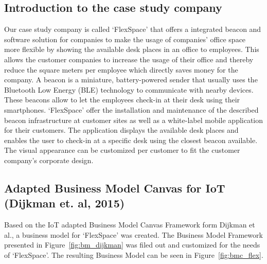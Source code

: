 	\subsection{Introduction to the case study company}
		Our case study company is called `FlexSpace' that offers a integrated beacon and software solution for companies to make the usage of companies' office space more flexible by showing the available desk places in an office to employees. This allows the customer companies to increase the usage of their office and thereby reduce the square meters per employee which directly saves money for the company. A beacon is a miniature, battery-powered sender that usually uses the Bluetooth Low Energy (BLE) technology to communicate with nearby devices. These beacons allow to let the employees check-in at their desk using their smartphones. `FlexSpace' offer the installation and maintenance of the described beacon infrastructure at customer sites as well as a white-label mobile application for their customers. The application displays the available desk places and enables the user to check-in at a specific desk using the closest beacon available. The visual appearance can be customized per customer to fit the customer company's corporate design.


	\subsection{Adapted Business Model Canvas for IoT (Dijkman et. al, 2015)}

	Based on the IoT adapted Business Model Canvas Framework form Dijkman et al., a business model for `FlexSpace' was created. The Business Model Framework presented in Figure~\ref{fig:bm_dijkman} was filed out and customized for the needs of `FlexSpace'. The resulting Business Model can be seen in Figure~\ref{fig:bmc_flex}.

